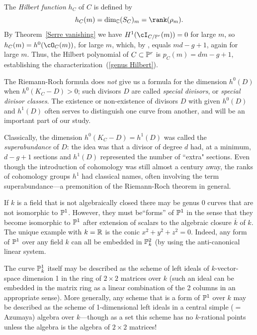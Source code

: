 The \emph{Hilbert function} $h_C$ of $C$  is defined by
$$
h_C(m) = \dim_{\CC} (S_{C})_{m} = \rank(\rho_m).
$$
By Theorem~\ref{Serre vanishing} we have $H^1(\cI_{C/\PP^r}(m)) = 0$ for large $m$, so $h_{C}(m) = h^0(\cO_C(m))$, for large $m$, which, by \trr, equals $md-g+1$, again for large $m$. Thus, the Hilbert polynomial of $C \subset \PP^r$ is $p_C(m) = dm-g+1$, establishing the characterization~(\ref{genus Hilbert}).
 
The Riemann-Roch formula does \emph{not} give us a formula for the dimension $h^0(D)$ when $h^0(K_C - D)>0$; such divisors $D$ are called \emph{special divisors}, or \emph{special divisor classes}. The existence or non-existence of divisors $D$ with given $h^{0}(D)$ and $h^{1}(D)$ often serves to distinguish one curve from another, and will be an important part of our study.
 
 
\begin{fact}
 Classically, the dimension $h^0(K_C-D) = h^1(D)$ was called the \emph{superabundance} of $D$: the idea was that a divisor of degree $d$ had, at a minimum, $d-g+1$ sections and $h^1(D)$ represented the number of ``extra" sections. Even though the introduction of cohomology was still almost a century away, the ranks of cohomology groups $h^1$ had classical names, often involving the term superabundance---a premonition of the Riemann-Roch theorem in general.
\end{fact}
 
\begin{fact}
If $k$ is a field that is not algebraically closed there may be genus 0 curves that are not isomorphic to $\PP^1$. However, they must be``forms'' of $\PP^1$ in the sense that they become isomorphic to $\PP^1$ after extension of scalars to 
the algebraic closure $\overline k$ of $k$. The unique example with $k = \RR$ is the conic $x^2+y^2+z^2 = 0$. Indeed, any form of $\PP^1$ over any field $k$ can all be embedded in $\PP_{k}^2$ (by using the anti-canonical linear system.

The curve $\PP_k^1$ itself may be described as the scheme of left ideals of $k$-vector-space dimension 1 in the ring of
$2\times 2$ matrices over $k$ (such an ideal can be embedded in the matrix ring as a linear combination of the 2 columns in an appropriate sense). More generally, any scheme that is a form of $\PP^1$ over $k$
may be described as the scheme of 1-dimensional left ideals in a central simple ($=$ Azumaya) algebra over $k$---though as a set this scheme has no $k$-rational points unless the algebra is the algebra of $2\times 2$ matrices!
\end{fact}
